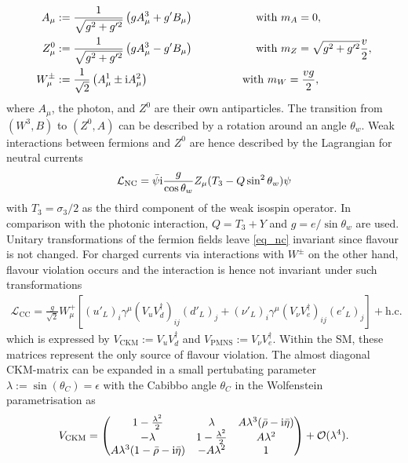 \begin{align}
 A_\mu & := \frac{1}{\sqrt{g^2+g'^2}}\left(gA^3_\mu + g'B_\mu\right)\hspace{2cm}\text{with }m_A = 0,\\
 Z^0_\mu & := \frac{1}{\sqrt{g^2+g'^2}}\left(gA^3_\mu - g'B_\mu\right)\hspace{2cm}\text{with }m_Z = \sqrt{g^2+g'^2}\frac{v}{2},\\
 W^\pm_\mu &:= \frac{1}{\sqrt{2}}\left(A^1_\mu \pm \ti A^2_\mu\right)\hspace{3cm}\text{with }m_W=\frac{vg}{2},
\end{align}
where $A_\mu$, the photon, and $Z^0$ are their own antiparticles. The transition from $(W^3,B)$ to $(Z^0,A)$ can be described by a rotation around an angle $\theta_w$. Weak interactions
between fermions and $Z^0$ are hence described by the Lagrangian for neutral currents
\begin{align}
 \mathcal{L}_\text{NC} = \bar \psi \text{i}\frac{g}{\cos\theta_w}Z_\mu(T_3-Q\sin^2\theta_w) \psi
 \label{eq_nc}
\end{align}
with $T_3=\sigma_3/2$ as the third component of the weak isospin operator. In comparison with the photonic interaction, $Q=T_3+Y$ and 
$g=e/\sin\theta_w$ are used. Unitary transformations of the fermion fields leave \eqref{eq_nc} invariant since flavour is not changed. For 
charged currents via interactions with $W^\pm$ on the other hand, flavour violation occurs and the interaction is hence not invariant under
such transformations
\begin{align}
 \mathcal{L}_\text{CC} = \frac{g}{\sqrt{2}} W^+_\mu \left[(u'_L)_i \gamma^\mu(V_u V^\dagger_d)_{ij} (d'_L)_j + (\nu'_L)_i \gamma^\mu(V_\nu V^\dagger_e)_{ij} (e'_L)_j\right] + \text{h.c.}
 \label{eq_cc}
\end{align}
which is expressed by $V_\text{CKM}:=V_uV^\dagger_d$ and $V_\text{PMNS}:=V_\nu V^\dagger_e$. Within the SM, these matrices represent the only
source of flavour violation. The almost diagonal CKM-matrix can be expanded in a small pertubating parameter $\lambda:=\sin(\theta_C)=\epsilon$ with
the Cabibbo angle $\theta_C$ in the Wolfenstein parametrisation as
\begin{align}
 V_\text{CKM} = \begin{pmatrix}
                 1-\frac{\lambda^2}{2} & \lambda & A\lambda^3(\bar\rho -\text{i} \bar\eta)\\
                 -\lambda & 1-\frac{\lambda^2}{2} & A\lambda^2\\
                 A\lambda^3(1-\bar\rho -\text{i} \bar\eta) & -A\lambda^2 & 1
                \end{pmatrix} + \mathcal{O}(\lambda^4).
            \label{eq_ckm}
\end{align}
